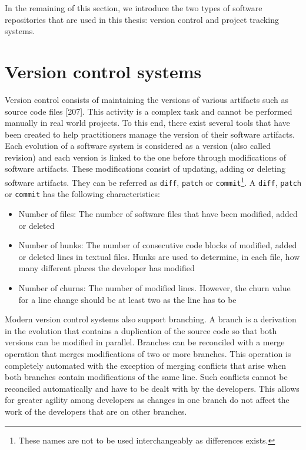 \documentclass[12pt]{report}
\providecommand{\tightlist}{%
  \setlength{\itemsep}{0pt}\setlength{\parskip}{0pt}}
\begin{document}
In the remaining of this section, we introduce the two types of software
repositories that are used in this thesis: version control and project
tracking systems.

\section{\texorpdfstring{Version control
systems\label{sec:version-control}}{Version control systems}}\label{version-control-systems}

Version control consists of maintaining the versions of various
artifacts such as source code files {[}207{]}. This activity is a
complex task and cannot be performed manually in real world projects. To
this end, there exist several tools that have been created to help
practitioners manage the version of their software artifacts. Each
evolution of a software system is considered as a version (also called
revision) and each version is linked to the one before through
modifications of software artifacts. These modifications consist of
updating, adding or deleting software artifacts. They can be referred as
\lstinline!diff!, \lstinline!patch! or
\lstinline!commit!\footnote{These names are not to be used interchangeably as differences exists.}.
A \lstinline!diff!, \lstinline!patch! or \lstinline!commit! has the
following characteristics:

\begin{itemize}
\tightlist
\item
  Number of files: The number of software files that have been modified,
  added or deleted
\item
  Number of hunks: The number of consecutive code blocks of modified,
  added or deleted lines in textual files. Hunks are used to determine,
  in each file, how many different places the developer has modified
\item
  Number of churns: The number of modified lines. However, the churn
  value for a line change should be at least two as the line has to be
\end{itemize}

Modern version control systems also support branching. A branch is a
derivation in the evolution that contains a duplication of the source
code so that both versions can be modified in parallel. Branches can be
reconciled with a merge operation that merges modifications of two or
more branches. This operation is completely automated with the exception
of merging conflicts that arise when both branches contain modifications
of the same line. Such conflicts cannot be reconciled automatically and
have to be dealt with by the developers. This allows for greater agility
among developers as changes in one branch do not affect the work of the
developers that are on other branches.
\end{document}
